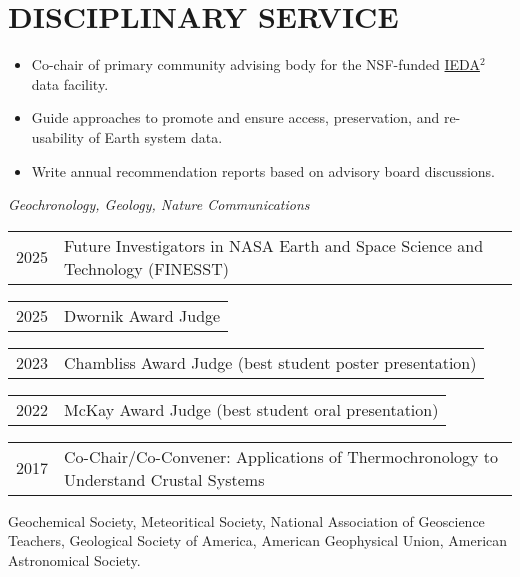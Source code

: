 \section{DISCIPLINARY SERVICE}

\begin{itemize}
	\item Co-chair of primary community advising body for the NSF-funded \href{https://www.iedadata.org/}{IEDA$^2$} data facility.
	\item Guide approaches to promote and ensure access, preservation, and re-usability of Earth system data.
	\item Write annual recommendation reports based on advisory board discussions. 
\end{itemize}

\textit{Geochronology, Geology, Nature Communications}

\begin{tabular}{ll} 
	2025 & Future Investigators in NASA Earth and Space Science and Technology (FINESST)
\end{tabular}


\begin{tabular}{ll} 
	2025 & Dwornik Award Judge
\end{tabular}

\begin{tabular}{ll} 
	2023 & Chambliss Award Judge (best student poster presentation)
\end{tabular}

\begin{tabular}{ll} 
	2022 & 	McKay Award Judge (best student oral presentation)
\end{tabular}

\begin{tabular}{ll} 
	2017 & 	Co-Chair/Co-Convener: Applications of Thermochronology to Understand Crustal Systems
\end{tabular}

Geochemical Society, Meteoritical Society, National Association of Geoscience Teachers, Geological Society of America, American Geophysical Union, American Astronomical Society.